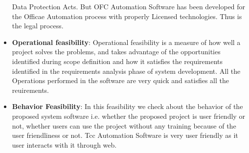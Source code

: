 \begin{itemize}
Data Protection Acts. But OFC Automation Software has been developed 
for the Officae Automation process with properly Licensed technologies. 
Thus is the legal process.
\item {\bf{Operational feasibility}}: Operational feasibility is a measure 
of how well a project solves the problems, and takes advantage of the 
opportunities identified during scope definition and how it satisfies 
the requirements identified in the requirements analysis phase of system 
development. All the Operations performed in the software are very quick 
and satisfies all the reuirements.
\item {\bf{Behavior Feasibility}}: In this feasibility we check about the 
behavior of the proposed system software i.e. whether the proposed 
project is user friendly or not, whether users can use the project 
without any training because of the user friendliness or not. Tcc 
Automation Software is very user friendly as it user interacts with it 
through web.
\end{itemize}

